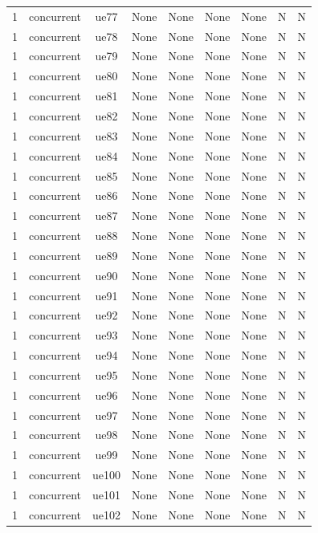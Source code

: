 \begin{table}[ht]
\begin{tabular}{|c|c|c|c|c|c|c|c|c|}
1 & concurrent & ue77 & None & None & None & None & N & N \\
1 & concurrent & ue78 & None & None & None & None & N & N \\
1 & concurrent & ue79 & None & None & None & None & N & N \\
1 & concurrent & ue80 & None & None & None & None & N & N \\
1 & concurrent & ue81 & None & None & None & None & N & N \\
1 & concurrent & ue82 & None & None & None & None & N & N \\
1 & concurrent & ue83 & None & None & None & None & N & N \\
1 & concurrent & ue84 & None & None & None & None & N & N \\
1 & concurrent & ue85 & None & None & None & None & N & N \\
1 & concurrent & ue86 & None & None & None & None & N & N \\
1 & concurrent & ue87 & None & None & None & None & N & N \\
1 & concurrent & ue88 & None & None & None & None & N & N \\
1 & concurrent & ue89 & None & None & None & None & N & N \\
1 & concurrent & ue90 & None & None & None & None & N & N \\
1 & concurrent & ue91 & None & None & None & None & N & N \\
1 & concurrent & ue92 & None & None & None & None & N & N \\
1 & concurrent & ue93 & None & None & None & None & N & N \\
1 & concurrent & ue94 & None & None & None & None & N & N \\
1 & concurrent & ue95 & None & None & None & None & N & N \\
1 & concurrent & ue96 & None & None & None & None & N & N \\
1 & concurrent & ue97 & None & None & None & None & N & N \\
1 & concurrent & ue98 & None & None & None & None & N & N \\
1 & concurrent & ue99 & None & None & None & None & N & N \\
1 & concurrent & ue100 & None & None & None & None & N & N \\
1 & concurrent & ue101 & None & None & None & None & N & N \\
1 & concurrent & ue102 & None & None & None & None & N & N \\

\end{tabular}
\end{table}
